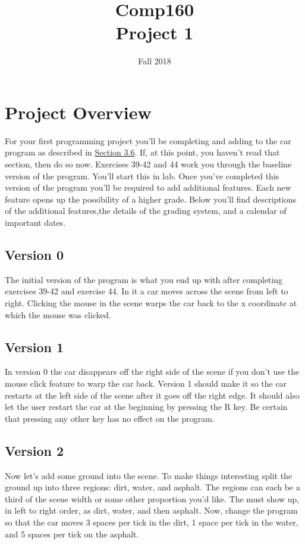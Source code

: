 \documentclass[10pt]{article}
\title{Comp160 \\ Project 1 }
\author{}
\date{ Fall 2018 }
\begin{document}
\maketitle

\section*{Project Overview}

For your first programming project you'll be completing and adding to the car program as described in \href{https://htdp.org/2018-01-06/Book/part_one.html#%28part._.D.K._sec~3adesign-world%29}{Section 3.6}.  If, at this point, you haven't read that section, then do so now. Exercises 39-42 and 44 work you through the baseline version of the program. You'll start this in lab. Once you've completed this version of the program you'll be required to add additional features. Each new feature opens up the possibility of a higher grade. Below you'll find descriptions of the additional features,the details of the grading system, and a calendar of important dates.

\subsection*{Version 0}

The initial version of the program is what you end up with after completing exercises 39-42 and exercise 44. In it a car moves across the scene from left to right. Clicking the mouse in the scene warps the car back to the x coordinate at which the mouse was clicked.

\subsection*{Version 1}

In version 0 the car disappears off the right side of the scene if you don't use the mouse click feature to warp the car back. Version 1 should make it so the car restarts at the left side of the scene after it goes off the right edge. It should also let the user restart the car at the beginning by pressing the R key. Be certain that pressing any other key has no effect on the program.

\subsection*{Version 2}

Now let's add some ground into the scene. To make things interesting split the ground up into three regions: dirt, water, and asphalt. The regions can each be a third of the scene width or some other proportion you'd like. The must show up, in left to right order, as dirt, water, and then asphalt. Now, change the program so that the car moves 3 spaces per tick in the dirt, 1 space per tick in the water, and 5 spaces per tick on the asphalt.
\end{document}
